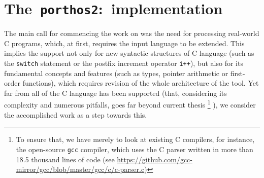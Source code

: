 \chapter{The~\texttt{porthos2}:~implementation}
\label{ch:impl}

The main call for commencing the work on \porthos[2] was the need for processing real-world C programs, which, at first, requires the input language to be extended.
This implies the support not only for new syntactic structures of C language (such as the \texttt{switch} statement or the postfix increment operator \texttt{i++}), but also for its fundamental concepts and features (such as types, pointer arithmetic or first-order functions), which requires revision of the whole architecture of the tool.
Yet far from all of the C language has been supported (that, considering its complexity and numerous pitfalls, goes far beyond current thesis%
\footnote{To ensure that, we have merely to look at existing C compilers, for instance, the open-source \texttt{gcc} compiler, which uses the C parser written in more than 18.5 thousand lines of code (see \url{https://github.com/gcc-mirror/gcc/blob/master/gcc/c/c-parser.c})}%
), we consider the accomplished work as a step towards this.





